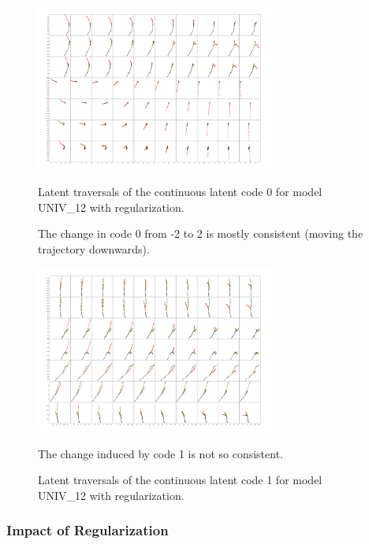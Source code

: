 \begin{figure}[t]
  \centering
  \includegraphics[width=0.7\textwidth]{figures/reg_cont_interpolations_code0_batch3.jpeg}
  \caption{Latent traversals of the continuous latent code 0 for model UNIV\_12 with regularization. }{The change in code 0 from -2 to 2 is mostly consistent (moving the trajectory downwards).}
  \label{cont_code_0}

  \includegraphics[width=0.7\textwidth]{figures/reg_cont_interpolations_code1_batch1.jpeg}
  \caption{Latent traversals of the continuous latent code 1 for model UNIV\_12 with regularization. }
  {The change induced by code 1 is not so consistent. }
  \label{cont_code_1}
\end{figure}

\subsubsection{Impact of Regularization}
\hfill \\

